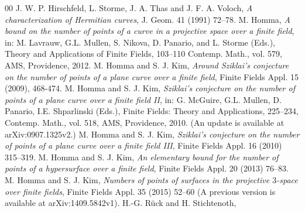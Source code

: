 \documentclass[a4paper,11pt]{article}
\begin{document}
\begin{thebibliography}{00}
J. W. P. Hirschfeld, L. Storme, J. A.  Thas and J. F. A.  Voloch,
{\em A characterization of Hermitian curves},
J. Geom. 41 (1991) 72--78.
M. Homma,
{\em A bound on the number of points of a curve in a projective space over a finite field},
in: M. Lavrauw, G.L. Mullen, S. Nikova, D. Panario, and L. Storme (Eds.),
Theory and Applications of Finite Fields, 103--110
Contemp. Math., vol. 579, AMS,
Providence, 2012.
M. Homma and S. J. Kim,
{\em Around Sziklai's conjecture on the number of points of
a plane curve over a finite field},
Finite Fields Appl. 15 (2009), 468-474.
M. Homma and S. J. Kim,
{\em Sziklai's conjecture on the number of points of
a plane curve over a finite field  {\rm II}},
in: G. McGuire, G.L. Mullen, D. Panario, I.E. Shparlinski (Eds.),
Finite Fields: Theory and Applications, 225--234,
Contemp. Math., vol. 518, AMS,
Providence, 2010.
(An update is available at arXiv:0907.1325v2.)
M. Homma and S. J. Kim,
{\em Sziklai's conjecture on the number of points of
a plane curve over a finite field  {\rm III}},
Finite Fields Appl. 16 (2010) 315--319.
M. Homma and S. J. Kim,
{\em An elementary bound for the number of points of
a hypersurface over a finite field},
Finite Fields Appl. 20 (2013) 76--83.
M. Homma and S. J. Kim,
{\em Numbers of points of surfaces in the projective $3$-space
over finite fields},
Finite Fields Appl. 35 (2015) 52--60
(A previous version is available at arXiv:1409.5842v1).
H.-G. R\"{u}ck and H. Stichtenoth,

\end{thebibliography}
\end{document}
